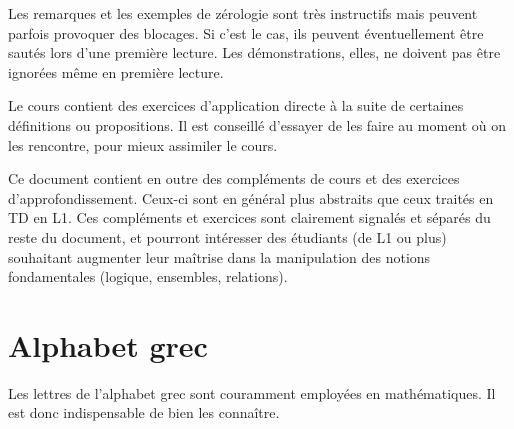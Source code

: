 \documentclass[11pt,a4paper]{book}
\theoremstyle{definition}
\theoremstyle{plain}
\begin{document}
Les remarques et les exemples de \og zérologie\fg{} sont très instructifs mais peuvent parfois provoquer des blocages. Si c'est le cas, ils peuvent éventuellement être sautés lors d'une première lecture. Les démonstrations, elles, ne doivent pas être ignorées même en première lecture.

Le cours contient des exercices d'application directe à la suite de certaines définitions ou propositions. Il est conseillé d'essayer de les faire au moment où on les rencontre, pour mieux assimiler le cours.

Ce document contient en outre des compléments de cours et des exercices d'approfondissement. Ceux-ci  sont en général plus abstraits que ceux traités en TD en L1. Ces compléments et exercices sont clairement signalés et séparés du reste du document, et pourront intéresser des étudiants (de L1 ou plus) souhaitant augmenter leur maîtrise dans la manipulation des notions fondamentales (logique, ensembles, relations).

\newpage
\section{Alphabet grec}

\noindent Les lettres de l'alphabet grec sont couramment employées en mathématiques. Il est donc indispensable de bien les connaître.
\end{document}
